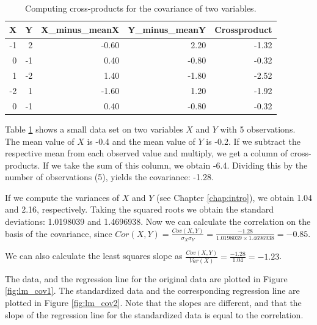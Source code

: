 \documentclass[]{book}\usepackage[]{graphicx}\usepackage[]{color}
\begin{document}
\begin{table}[ht]
\centering
\caption{Computing cross-products for the covariance of two variables.} 
\label{tab:lm_118}
\begin{tabular}{rrrrr}
  \hline
X & Y & X\_minus\_meanX & Y\_minus\_meanY & Crossproduct \\ 
  \hline
-1 & 2 & -0.60 & 2.20 & -1.32 \\ 
  0 & -1 & 0.40 & -0.80 & -0.32 \\ 
  1 & -2 & 1.40 & -1.80 & -2.52 \\ 
  -2 & 1 & -1.60 & 1.20 & -1.92 \\ 
  0 & -1 & 0.40 & -0.80 & -0.32 \\ 
   \hline
\end{tabular}
\end{table}


Table \ref{tab:lm_118} shows a small data set on two variables $X$ and $Y$ with 5 observations. The mean value of $X$ is -0.4 and the mean value of $Y$ is -0.2. If we subtract the respective mean from each observed value and multiply, we get a column of cross-products. If we take the sum of this column, we obtain -6.4. Dividing this by the number of observations (5), yields the covariance: -1.28.

If we compute the variances of $X$ and $Y$ (see Chapter \ref{chap:intro}), we obtain 1.04 and 2.16, respectively. Taking the squared roots we obtain the standard deviations: 1.0198039 and 1.4696938. Now we can calculate the correlation on the basis of the covariance, since $Cor(X,Y)= \frac{Cov(X,Y)}{\sigma_X\sigma_Y}=\frac{-1.28}{1.0198039  \times  1.4696938} = -0.85$.

We can also calculate the least squares slope as $\frac{Cov(X,Y)}{Var(X)}= \frac{-1.28}{1.04} =  -1.23$.


The data, and the regression line for the original data are plotted in Figure \ref{fig:lm_cov1}. The standardized data and the corresponding regression line are plotted in Figure \ref{fig:lm_cov2}. Note that the slopes are different, and that the slope of the regression line for the standardized data is equal to the correlation. 
\end{document}
